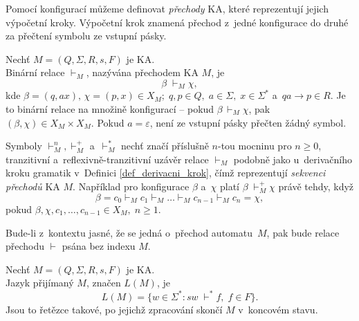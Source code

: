 Pomocí konfigurací můžeme definovat \emph{přechody} KA, které reprezentují jejich výpočetní kroky.
Výpočetní krok znamená přechod z~jedné konfigurace do druhé za přečtení symbolu ze vstupní pásky.
\begin{definition}\label{def_prechod_ka}
    Nechť $M = (Q, \Sigma, R, s, F)$ je KA.\\
    Binární relace $\vdash_{\scriptscriptstyle M}$, nazývána přechodem KA $M$, je
    \begin{equation*}
        \beta\; \vdash_{\scriptscriptstyle M}\chi,
    \end{equation*}
    kde $\beta = (q, ax),\, \chi = (p, x) \in X_M;\; q, p \in Q,\; a \in \Sigma,\; x \in \Sigma^*$ a~$qa \rightarrow p \in R$.
    Je to binární relace na množině konfigurací -- pokud $\beta\, \vdash_{\scriptscriptstyle M} \chi$, pak $(\beta, \chi) \in X_M \times X_M$.
    Pokud $a = \varepsilon$, není ze vstupní pásky přečten žádný symbol.
    
    Symboly $\vdash_{\scriptscriptstyle M}^n, \vdash_{\scriptscriptstyle M}^+$ a~$\vdash_{\scriptscriptstyle M}^*$ nechť značí příslušně $n$-tou mocninu pro $n \geq 0$, tranzitivní a~reflexivně-tranzitivní uzávěr relace $\vdash_{\scriptscriptstyle M}$ podobně jako u~derivačního kroku gramatik v~Definici \ref{def_derivacni_krok}, čímž reprezentují \emph{sekvenci přechodů} KA $M$.
    Například pro konfigurace $\beta$ a~$\chi$ platí $\beta\; \vdash_{\scriptscriptstyle M}^+ \chi$ právě tehdy, když
    \begin{equation*}
        \beta = c_0 \vdash_{\scriptscriptstyle M} c_1 \vdash_{\scriptscriptstyle M} \ldots \vdash_{\scriptscriptstyle M} c_{n-1} \vdash_{\scriptscriptstyle M} c_{n} = \chi,
    \end{equation*}
    pokud $\beta, \chi, c_1, \ldots, c_{n-1} \in X_M,\; n \geq 1$.
\end{definition}

\begin{convention}
    Bude-li z~kontextu jasné, že se jedná o~přechod automatu~$M$, pak bude relace přechodu $\vdash$ psána bez indexu $M$.  
\end{convention}

\begin{definition}
    Nechť $M = (Q, \Sigma, R, s, F)$ je KA.\\
    Jazyk přijímaný $M$, značen $L(M)$, je
    \begin{equation*}
        L(M) = \{w \in \Sigma^*: sw\; \vdash^* f,\; f \in F\}.
    \end{equation*}
    Jsou to řetězce takové, po jejichž zpracování skončí $M$ v~koncovém stavu.
\end{definition}


